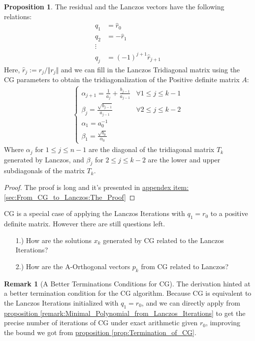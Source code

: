 \documentclass[]{article}
\theoremstyle{definition}
\newtheorem{prop}{Proposition}[section]  %
\newtheorem{remark}{Remark}[subsection]  %
\begin{document}
        \begin{prop}
            The residual and the Lanczos vectors have the following relations: 
            \begin{align}
                q_1 &= \hat r_0\\
                q_2 &= -\hat r_1
                \\
                \vdots
                \\
                q_j &= (-1)^{j + 1}\hat r_{j + 1}
            \end{align}
            Here, $\hat{r}_j:= r_j/\Vert r_j\Vert$ and we can fill in the Lanczos Tridiagonal matrix using the CG parameters to obtain the tridiagonalization of the Positive definite matrix $A$: 
            \begin{align}
                \begin{cases}
                    \alpha_{j + 1} = \frac{1}{a_j} + \frac{b_{j - 1}}{a_{j - 1}}
                    & \forall 1 \le j \le k - 1
                    \\
                    \beta_{j} = \frac{\sqrt{b_{j - 1}}}{a_{j - 1}}
                    & \forall 2 \le j \le k - 2 
                    \\
                    \alpha_1 = a_0^{-1} & 
                    \\
                    \beta_1 = \frac{\sqrt{b_0}}{\alpha_0}
                \end{cases}
            \end{align}
            Where $\alpha_j$ for $1\le j \le n - 1$ are the diagonal of the tridiagonal matrix $T_k$ generated by Lanczos, and $\beta_j$ for $2\le j \le k - 2$ are the lower and upper subdiagonals of the matrix $T_k$. 
        \end{prop}
        \begin{proof}
            The proof is long and it's presented in \hyperref[sec:From_CG_to_Lanczos:The_Proof]{appendex item: \ref*{sec:From_CG_to_Lanczos:The_Proof}}
        \end{proof}
        CG is a special case of applying the Lanczos Iterations with $q_1 = r_0$ to a positive definite matrix. However there are still questions left. 
            \begin{enumerate}
                \item [1.)] How are the solutions $x_k$ generated by CG related to the Lanczos Iterations? 
                \item [2.)] How are the A-Orthogonal vectors $p_k$ from CG related to Lanczos?
            \end{enumerate}
        \begin{remark}[A Better Terminations Conditions for CG]
                The derivation hinted at a better termination condition for the CG algorithm. Because CG is equivalent to the Lanczos Iterations initialized with $q_1 = r_0$, and we can directly apply from \hyperref[remark:Minimal_Polynomial_from_Lanczos_Iterations]{proposition \ref*{remark:Minimal_Polynomial_from_Lanczos_Iterations}} to get the precise number of iterations of CG under exact arithmetic given $r_0$, improving the bound we got from \hyperref[prop:Termination_of_CG]{proposition \ref*{prop:Termination_of_CG}}.
            \end{remark}
\end{document}
